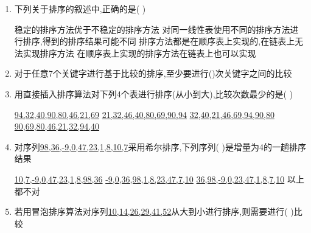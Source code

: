\documentclass[12pt, a4paper, oneside, UTF8]{ctexbook}
\begin{document}
\begin{enumerate}

    \item 下列关于排序的叙述中,正确的是(   ) 
    \begin{choices}[1]
        \task 稳定的排序方法优于不稳定的排序方法
        \task 对同一线性表使用不同的排序方法进行排序,得到的排序结果可能不同
        \task 排序方法都是在顺序表上实现的,在链表上无法实现排序方法
        \task 在顺序表上实现的排序方法在链表上也可以实现
    \end{choices}


    \item 对于任意7个关键字进行基于比较的排序,至少要进行()次关键字之间的比较
    \begin{choices}
    \end{choices}

    \item 用直接插入排序算法对下列4个表进行排序(从小到大),比较次数最少的是(   ) 
    \begin{choices}[2]
        \task \underline{94,32,40,90,80,46,21,69}
        \task \underline{21,32,46,40,80,69,90,94}
        \task \underline{32,40,21,46,69,94,90,80}
        \task \underline{90,69,80,46,21,32,94,40}
    \end{choices}

    \item 对序列\underline{98,36,-9,0,47,23,1,8,10,7}采用希尔排序,下列序列( )是增量为4的一趟排序结果 
    \begin{choices}[2]
        \task \underline{10,7,-9,0,47,23,1,8,98,36}
        \task \underline{-9,0,36,98,1,8,23,47,7,10}
        \task \underline{36,98,-9,0,23,47,1,8,7,10}
        \task 以上都不对
    \end{choices}

    \item 若用冒泡排序算法对序列\underline{10,14,26,29,41,52}从大到小进行排序,则需要进行(  )比较 
    \begin{choices}
    \end{choices}


\end{enumerate}
\end{document}
